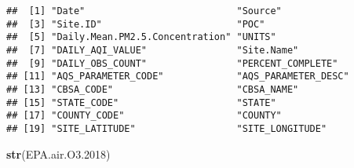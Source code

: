 \documentclass[]{article}
\newenvironment{Shaded}{\begin{snugshade}}{\end{snugshade}}
\newcommand{\FloatTok}[1]{\textcolor[rgb]{0.00,0.00,0.81}{#1}}
\newcommand{\KeywordTok}[1]{\textcolor[rgb]{0.13,0.29,0.53}{\textbf{#1}}}
\newcommand{\NormalTok}[1]{#1}
\begin{document}
\begin{verbatim}
##  [1] "Date"                           "Source"                        
##  [3] "Site.ID"                        "POC"                           
##  [5] "Daily.Mean.PM2.5.Concentration" "UNITS"                         
##  [7] "DAILY_AQI_VALUE"                "Site.Name"                     
##  [9] "DAILY_OBS_COUNT"                "PERCENT_COMPLETE"              
## [11] "AQS_PARAMETER_CODE"             "AQS_PARAMETER_DESC"            
## [13] "CBSA_CODE"                      "CBSA_NAME"                     
## [15] "STATE_CODE"                     "STATE"                         
## [17] "COUNTY_CODE"                    "COUNTY"                        
## [19] "SITE_LATITUDE"                  "SITE_LONGITUDE"
\end{verbatim}

\begin{Shaded}
\begin{Highlighting}[]
\KeywordTok{str}\NormalTok{(EPA.air.O3}\FloatTok{.2018}\NormalTok{)}
\end{Highlighting}
\end{Shaded}
\end{document}
